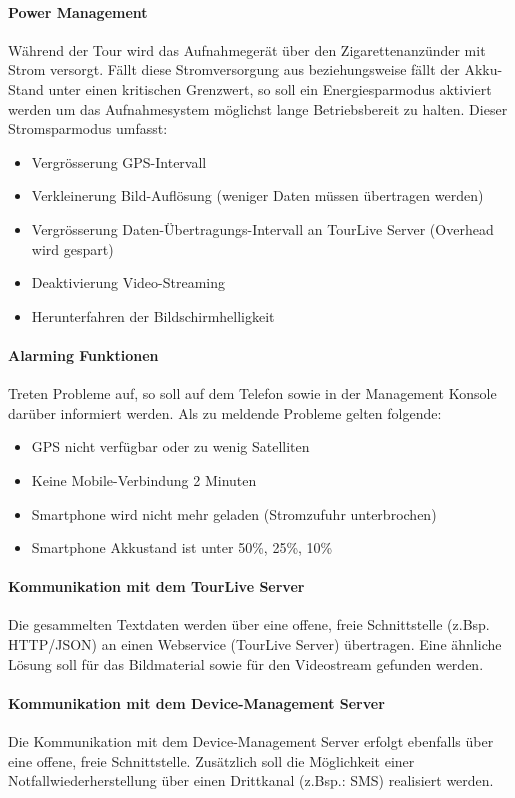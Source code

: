 \paragraph{Power Management}
Während der Tour wird das Aufnahmegerät über den Zigarettenanzünder mit Strom versorgt. Fällt diese Stromversorgung aus beziehungsweise fällt der Akku-Stand unter einen kritischen Grenzwert, so soll ein Energiesparmodus aktiviert werden um das Aufnahmesystem möglichst lange Betriebsbereit zu halten. Dieser Stromsparmodus umfasst:
\begin{itemize}
\item Vergrösserung GPS-Intervall
\item Verkleinerung Bild-Auflösung (weniger Daten müssen übertragen werden)
\item Vergrösserung Daten-Übertragungs-Intervall an TourLive Server (Overhead wird gespart)
\item Deaktivierung Video-Streaming
\item Herunterfahren der Bildschirmhelligkeit
\end{itemize}

\label{par:alarming}
\paragraph{Alarming Funktionen}
Treten Probleme auf, so soll auf dem Telefon sowie in der Management Konsole darüber informiert werden. Als zu meldende Probleme gelten folgende:
\begin{itemize}
\item GPS nicht verfügbar oder zu wenig Satelliten
\item Keine Mobile-Verbindung 2 Minuten
\item Smartphone wird nicht mehr geladen (Stromzufuhr unterbrochen)
\item Smartphone Akkustand ist unter 50\%, 25\%, 10\%
\end{itemize}

	
\paragraph{Kommunikation mit dem TourLive Server}
Die gesammelten Textdaten werden über eine offene, freie Schnittstelle (z.Bsp. HTTP/JSON) an einen Webservice (TourLive Server) übertragen. Eine ähnliche Lösung soll für das Bildmaterial sowie für den Videostream gefunden werden.

\paragraph{Kommunikation mit dem Device-Management Server}
Die Kommunikation mit dem Device-Management Server erfolgt ebenfalls über eine offene, freie Schnittstelle. Zusätzlich soll die Möglichkeit einer Notfallwiederherstellung über einen Drittkanal (z.Bsp.: SMS) realisiert werden.


